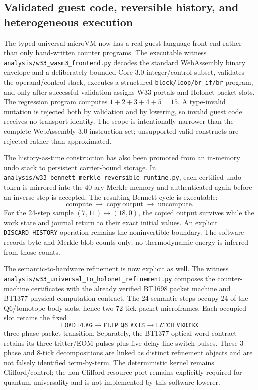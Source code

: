 \subsection{Validated guest code, reversible history, and heterogeneous execution}

The typed universal microVM now has a real guest-language front end rather than
only hand-written counter programs.  The executable witness
\texttt{analysis/w33\_wasm3\_frontend.py} decodes the standard WebAssembly
binary envelope and a deliberately bounded Core-3.0 integer/control subset,
validates the operand/control stack, executes a structured
\texttt{block/loop/br\_if/br} program, and only after successful validation
assigns W33 portals and Holonet packet slots.  The regression program computes
\(1+2+3+4+5=15\).  A type-invalid mutation is rejected both by validation and
by lowering, so invalid guest code receives no transport identity.  The scope
is intentionally narrower than the complete WebAssembly 3.0 instruction set;
unsupported valid constructs are rejected rather than approximated.

The history-as-time construction has also been promoted from an in-memory undo
stack to persistent carrier-bound storage.  In
\texttt{analysis/w33\_bennett\_merkle\_reversible\_runtime.py}, each certified
undo token is mirrored into the 40-ary Merkle memory and authenticated again
before an inverse step is accepted.  The resulting Bennett cycle is executable:
\[
  \mathrm{compute}\;\longrightarrow\;\mathrm{copy\ output}
  \;\longrightarrow\;\mathrm{uncompute}.
\]
For the 24-step sample \((7,11)\mapsto(18,0)\), the copied output survives while
the work state and journal return to their exact initial values.  An explicit
\texttt{DISCARD\_HISTORY} operation remains the noninvertible boundary.  The
software records byte and Merkle-blob counts only; no thermodynamic energy is
inferred from those counts.

The semantic-to-hardware refinement is now explicit as well.  The witness
\texttt{analysis/w33\_universal\_to\_holonet\_refinement.py} composes the
counter-machine certificates with the already verified BT1698 packet machine
and BT1377 physical-computation contract.  The 24 semantic steps occupy 24 of
the Q6/tomotope body slots, hence two 72-tick packet microframes.  Each occupied
slot retains the fixed
\[
  \texttt{LOAD\_FLAG}\to\texttt{FLIP\_Q6\_AXIS}\to\texttt{LATCH\_VERTEX}
\]
three-phase packet transition.  Separately, the BT1377 optical-word contract
retains its three tritter/EOM pulses plus five delay-line switch pulses.  These
\(3\)-phase and \(8\)-tick decompositions are linked as distinct refinement
objects and are not falsely identified term-by-term.  The deterministic kernel
remains Clifford/control; the non-Clifford resource port remains explicitly
required for quantum universality and is not implemented by this software
lowerer.

